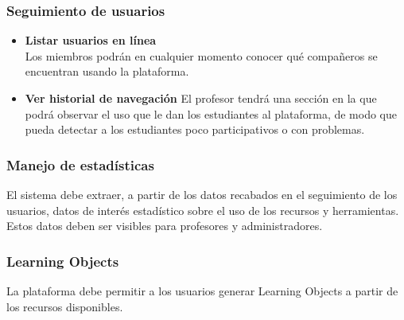 \subsubsection{Seguimiento de usuarios}
\begin{itemize}
	\item \textbf{Listar usuarios en línea}\\
	Los miembros podrán en cualquier momento conocer qué compañeros se encuentran usando la plataforma.
	\item \textbf{Ver historial de navegación}
	El profesor tendrá una sección en la que podrá observar el uso que le dan los estudiantes al plataforma, de modo que pueda detectar a los estudiantes poco participativos o con problemas.
\end{itemize}

\subsubsection{Manejo de estadísticas}
El sistema debe extraer, a partir de los datos recabados en el seguimiento de los usuarios, datos de interés estadístico sobre el uso de los recursos y herramientas. Estos datos deben ser visibles para profesores y administradores.

\subsubsection{Learning Objects}
La plataforma debe permitir a los usuarios generar Learning Objects a partir de los recursos disponibles.